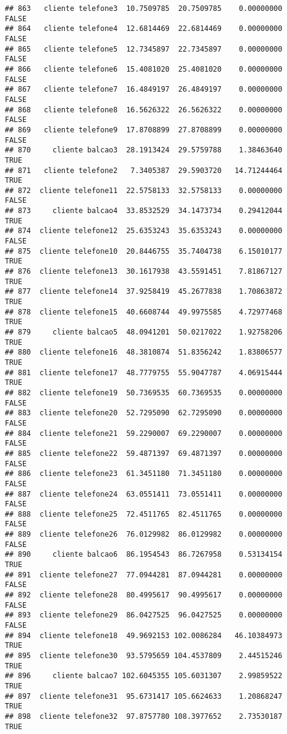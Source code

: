 \documentclass[
]{article}
\begin{document}
\begin{verbatim}
## 863   cliente telefone3  10.7509785  20.7509785    0.00000000    FALSE
## 864   cliente telefone4  12.6814469  22.6814469    0.00000000    FALSE
## 865   cliente telefone5  12.7345897  22.7345897    0.00000000    FALSE
## 866   cliente telefone6  15.4081020  25.4081020    0.00000000    FALSE
## 867   cliente telefone7  16.4849197  26.4849197    0.00000000    FALSE
## 868   cliente telefone8  16.5626322  26.5626322    0.00000000    FALSE
## 869   cliente telefone9  17.8708899  27.8708899    0.00000000    FALSE
## 870     cliente balcao3  28.1913424  29.5759788    1.38463640     TRUE
## 871   cliente telefone2   7.3405387  29.5903720   14.71244464     TRUE
## 872  cliente telefone11  22.5758133  32.5758133    0.00000000    FALSE
## 873     cliente balcao4  33.8532529  34.1473734    0.29412044     TRUE
## 874  cliente telefone12  25.6353243  35.6353243    0.00000000    FALSE
## 875  cliente telefone10  20.8446755  35.7404738    6.15010177     TRUE
## 876  cliente telefone13  30.1617938  43.5591451    7.81867127     TRUE
## 877  cliente telefone14  37.9258419  45.2677838    1.70863872     TRUE
## 878  cliente telefone15  40.6608744  49.9975585    4.72977468     TRUE
## 879     cliente balcao5  48.0941201  50.0217022    1.92758206     TRUE
## 880  cliente telefone16  48.3810874  51.8356242    1.83806577     TRUE
## 881  cliente telefone17  48.7779755  55.9047787    4.06915444     TRUE
## 882  cliente telefone19  50.7369535  60.7369535    0.00000000    FALSE
## 883  cliente telefone20  52.7295090  62.7295090    0.00000000    FALSE
## 884  cliente telefone21  59.2290007  69.2290007    0.00000000    FALSE
## 885  cliente telefone22  59.4871397  69.4871397    0.00000000    FALSE
## 886  cliente telefone23  61.3451180  71.3451180    0.00000000    FALSE
## 887  cliente telefone24  63.0551411  73.0551411    0.00000000    FALSE
## 888  cliente telefone25  72.4511765  82.4511765    0.00000000    FALSE
## 889  cliente telefone26  76.0129982  86.0129982    0.00000000    FALSE
## 890     cliente balcao6  86.1954543  86.7267958    0.53134154     TRUE
## 891  cliente telefone27  77.0944281  87.0944281    0.00000000    FALSE
## 892  cliente telefone28  80.4995617  90.4995617    0.00000000    FALSE
## 893  cliente telefone29  86.0427525  96.0427525    0.00000000    FALSE
## 894  cliente telefone18  49.9692153 102.0086284   46.10384973     TRUE
## 895  cliente telefone30  93.5795659 104.4537809    2.44515246     TRUE
## 896     cliente balcao7 102.6045355 105.6031307    2.99859522     TRUE
## 897  cliente telefone31  95.6731417 105.6624633    1.20868247     TRUE
## 898  cliente telefone32  97.8757780 108.3977652    2.73530187     TRUE

\end{verbatim}
\end{document}

